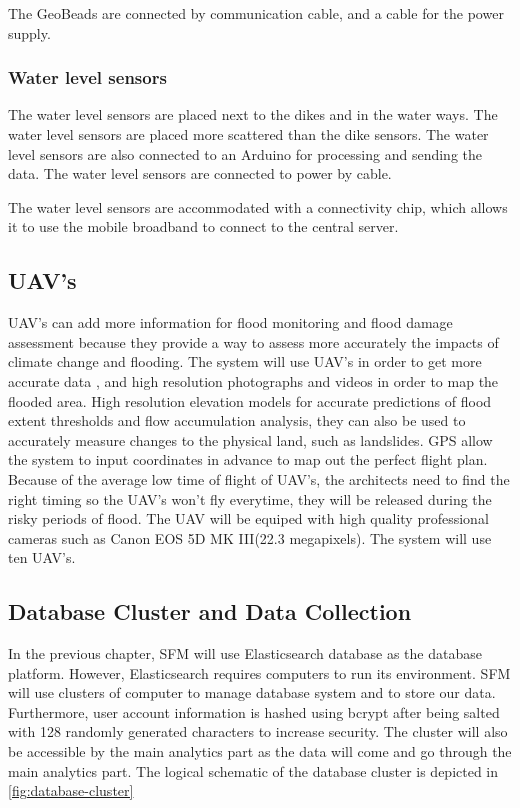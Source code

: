 The GeoBeads are connected by communication cable, and a cable for the power supply. 

\subsubsection*{Water level sensors}
The water level sensors are placed next to the dikes and in the water ways. The water level sensors are placed more scattered than the dike sensors. The water level sensors are also connected to an Arduino for processing and sending the data. The water level sensors are connected to power by cable.

The water level sensors are accommodated with a connectivity chip, which allows it to use the mobile broadband to connect to the central server.

\subsection{UAV's }
UAV's can add more information for flood monitoring and flood damage assessment because they provide a way to assess more accurately the impacts of climate change and flooding.
The system will use UAV's in order to get more accurate data , and high resolution photographs and videos in order to map the flooded area.
High resolution elevation models for accurate predictions of flood extent thresholds and flow accumulation analysis, they can also be used to accurately measure changes to the physical land, such as landslides.
GPS allow the system to input coordinates in advance to map out the perfect flight plan.
Because of the average low time of flight of UAV's, the architects need to find the right timing so the UAV's won't fly everytime, they will be released during the risky periods of flood.
The UAV will be equiped with high quality professional cameras such as Canon EOS 5D MK III(22.3 megapixels).
The system will use ten UAV's.

\clearpage
\subsection{Database Cluster and Data Collection}
\label{subsec:database-data}
In the previous chapter, SFM will use Elasticsearch database as the database platform. However, Elasticsearch requires computers to run its environment. SFM will use clusters of computer to manage database system and to store our data. Furthermore, user account information is hashed using bcrypt after being salted with 128 randomly generated characters to increase security. The cluster will also be accessible by the main analytics part as the data will come and go through the main analytics part. The logical schematic of the database cluster is depicted in \autoref{fig:database-cluster}

